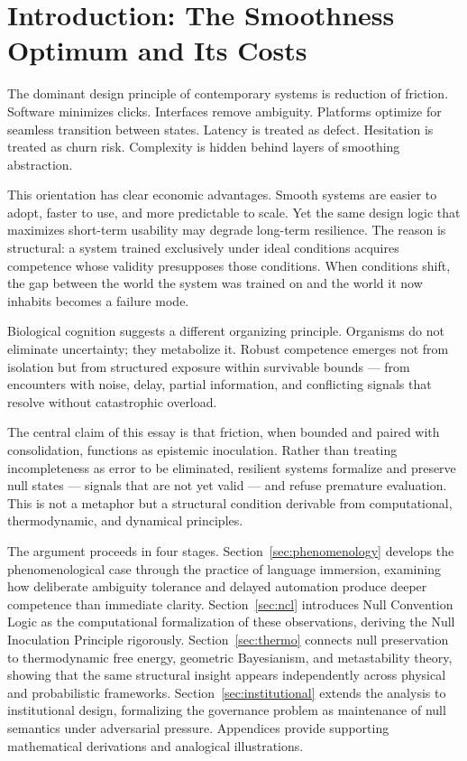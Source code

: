 \documentclass[11pt]{article}
\theoremstyle{remark}
\begin{document}
\section{Introduction: The Smoothness Optimum and Its Costs}
\label{sec:intro}

The dominant design principle of contemporary systems is reduction of friction. Software minimizes clicks. Interfaces remove ambiguity. Platforms optimize for seamless transition between states. Latency is treated as defect. Hesitation is treated as churn risk. Complexity is hidden behind layers of smoothing abstraction.

This orientation has clear economic advantages. Smooth systems are easier to adopt, faster to use, and more predictable to scale. Yet the same design logic that maximizes short-term usability may degrade long-term resilience. The reason is structural: a system trained exclusively under ideal conditions acquires competence whose validity presupposes those conditions. When conditions shift, the gap between the world the system was trained on and the world it now inhabits becomes a failure mode.

Biological cognition suggests a different organizing principle. Organisms do not eliminate uncertainty; they metabolize it. Robust competence emerges not from isolation but from structured exposure within survivable bounds --- from encounters with noise, delay, partial information, and conflicting signals that resolve without catastrophic overload.

The central claim of this essay is that friction, when bounded and paired with consolidation, functions as epistemic inoculation. Rather than treating incompleteness as error to be eliminated, resilient systems formalize and preserve null states --- signals that are not yet valid --- and refuse premature evaluation. This is not a metaphor but a structural condition derivable from computational, thermodynamic, and dynamical principles.

The argument proceeds in four stages. Section~\ref{sec:phenomenology} develops the phenomenological case through the practice of language immersion, examining how deliberate ambiguity tolerance and delayed automation produce deeper competence than immediate clarity. Section~\ref{sec:ncl} introduces Null Convention Logic as the computational formalization of these observations, deriving the Null Inoculation Principle rigorously. Section~\ref{sec:thermo} connects null preservation to thermodynamic free energy, geometric Bayesianism, and metastability theory, showing that the same structural insight appears independently across physical and probabilistic frameworks. Section~\ref{sec:institutional} extends the analysis to institutional design, formalizing the governance problem as maintenance of null semantics under adversarial pressure. Appendices provide supporting mathematical derivations and analogical illustrations.
\end{document}
